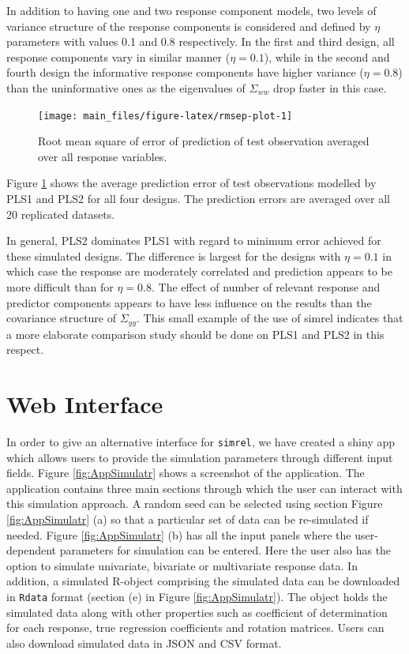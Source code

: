 \documentclass[review]{elsarticle}
\theoremstyle{definition}
\theoremstyle{definition}
\theoremstyle{definition}
\theoremstyle{remark}
\begin{document}
In addition to having one and two response component models, two levels
of variance structure of the response components is considered and
defined by \(\eta\) parameters with values 0.1 and 0.8 respectively. In
the first and third design, all response components vary in similar
manner (\(\eta = 0.1\)), while in the second and fourth design the
informative response components have higher variance (\(\eta = 0.8\))
than the uninformative ones as the eigenvalues of \(\Sigma_{ww}\) drop
faster in this case.

\begin{figure}[H]
\texttt{[image: main\_files/figure-latex/rmsep-plot-1]} \caption{Root mean square of error of prediction of test observation averaged over all response variables.}\label{fig:rmsep-plot}
\end{figure}

Figure \ref{fig:rmsep-plot} shows the average prediction error of test
observations modelled by PLS1 and PLS2 for all four designs. The
prediction errors are averaged over all 20 replicated datasets.

In general, PLS2 dominates PLS1 with regard to minimum error achieved
for these simulated designs. The difference is largest for the designs
with \(\eta = 0.1\) in which case the response are moderately correlated
and prediction appears to be more difficult than for \(\eta = 0.8\). The
effect of number of relevant response and predictor components appears
to have less influence on the results than the covariance structure of
\(\Sigma_{yy}\). This small example of the use of simrel indicates that
a more elaborate comparison study should be done on PLS1 and PLS2 in
this respect.

\hypertarget{web-interface}{\section{Web
Interface}\label{web-interface}}

In order to give an alternative interface for \texttt{simrel}, we have
created a shiny app which allows users to provide the simulation
parameters through different input fields. Figure \ref{fig:AppSimulatr}
shows a screenshot of the application. The application contains three
main sections through which the user can interact with this simulation
approach. A random seed can be selected using section Figure
\ref{fig:AppSimulatr} (a) so that a particular set of data can be
re-simulated if needed. Figure \ref{fig:AppSimulatr} (b) has all the
input panels where the user-dependent parameters for simulation can be
entered. Here the user also has the option to simulate univariate,
bivariate or multivariate response data. In addition, a simulated
R-object comprising the simulated data can be downloaded in
\texttt{Rdata} format (section (e) in Figure \ref{fig:AppSimulatr}). The
object holds the simulated data along with other properties such as
coefficient of determination for each response, true regression
coefficients and rotation matrices. Users can also download simulated
data in JSON and CSV format.
\end{document}
